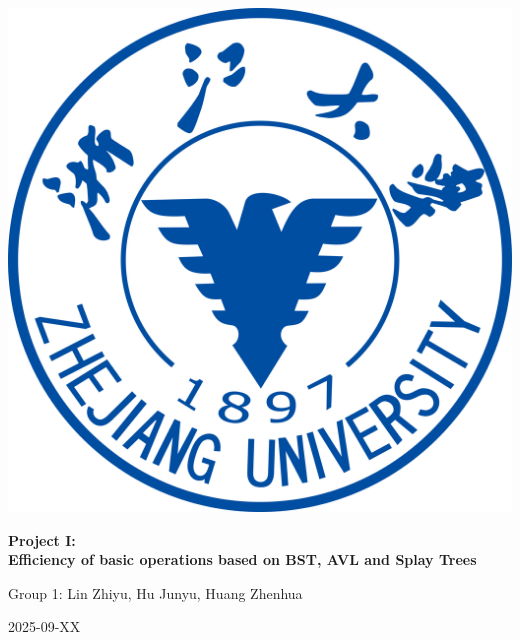 \thispagestyle{empty}
\begin{titlepage}
  \centering
  \vspace*{1cm}
  \includegraphics[width=0.35\paperwidth]{images/cover.png}\par
  \vspace{2cm}
  {\Huge\bfseries Project I:\\[0.5em]Efficiency of basic operations based on BST, AVL and Splay Trees\par}
  \vspace{1.5cm}
  {\Large Group 1: Lin Zhiyu, Hu Junyu, Huang Zhenhua\par}
  \vfill
  {\large 2025-09-XX\par}
\end{titlepage}
\clearpage
{}